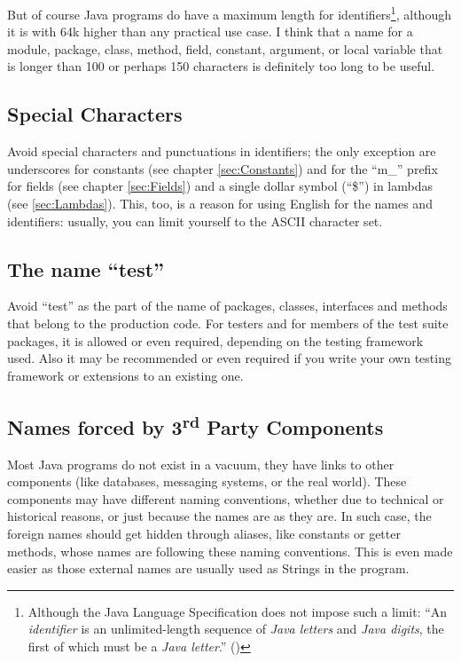 \documentclass[12pt,a4paper,titlepage, parskip=half, headsepline, footsepline, cleardoubleplain]{scrbook}
\begin{document}
But of course Java programs do have a maximum length for identifiers\footnote{Although the Java Language Specification does not impose such a limit: “An \textit{identifier} is an unlimited-length sequence of \textit{Java letters} and \textit{Java digits}, the first of which must be a \textit{Java letter}.” (\autocite{ORACLE_DOC_LANGUAGE_SPECIFICATION:Identifiers})}, although it is with 64k higher than any practical use case. I think that a name for a module, package, class, method, field, constant, argument, or local variable that is longer than 100 or perhaps 150 characters is definitely too long to be useful.

\subsection{Special Characters}
Avoid special characters and punctuations in identifiers; the only exception are underscores for constants (see chapter \vref{sec:Constants}) and for the “m\_” prefix for fields (see chapter \vref{sec:Fields}) and a single dollar symbol (“\$”) in lambdas (see \vref{sec:Lambdas}). This, too, is a reason for using English for the names and identifiers: usually, you can limit yourself to the ASCII character set.

\subsection{The name “test”}
Avoid “test” as the part of the name of packages, classes, interfaces and methods that belong to the production code. For testers and for members of the test suite packages, it is allowed or even required, depending on the testing framework used. Also it may be recommended or even required if you write your own testing framework or extensions to an existing one.

\subsection{Names forced by 3\textsuperscript{rd} Party Components}
Most Java programs do not exist in a vacuum, they have links to other components (like databases, messaging systems, or the real world). These components may have different naming conventions, whether due to technical or historical reasons, or just because the names are as they are. In such case, the foreign names should get hidden through aliases, like constants or getter methods, whose names are following these naming conventions. This is even made easier as those external names are usually used as Strings in the program.
\end{document}
